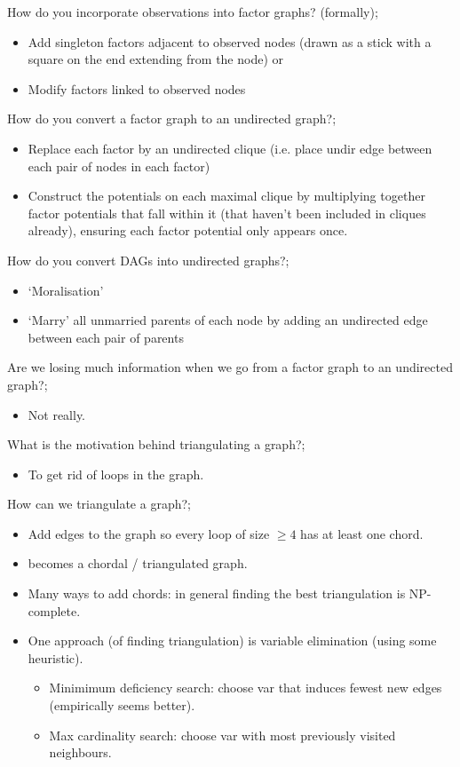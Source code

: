 \documentclass{article}
\begin{document}
How do you incorporate observations into factor graphs? (formally); \begin{itemize}
    \item Add singleton factors adjacent to observed nodes (drawn as a stick with a square on the end extending from the node) or
    \item Modify factors linked to observed nodes
\end{itemize}

How do you convert a factor graph to an undirected graph?; \begin{itemize}
    \item Replace each factor by an undirected clique (i.e. place undir edge between each pair of nodes in each factor)
    \item Construct the potentials on each maximal clique by multiplying together factor potentials that fall within it (that haven't been included in cliques already), ensuring each factor potential only appears once.
\end{itemize}

How do you convert DAGs into undirected graphs?; \begin{itemize}
    \item `Moralisation'
    \item `Marry' all unmarried parents of each node by adding an undirected edge between each pair of parents
\end{itemize}

Are we losing much information when we go from a factor graph to an undirected graph?; \begin{itemize}
    \item Not really.
\end{itemize}

What is the motivation behind triangulating a graph?; \begin{itemize}
    \item To get rid of loops in the graph.
\end{itemize}

How can we triangulate a graph?; \begin{itemize}
    \item Add edges to the graph so every loop of size $\geq 4$ has at least one chord.
    \item becomes a chordal / triangulated graph.
    \item Many ways to add chords: in general finding the best triangulation is NP-complete. 
    \item One approach (of finding triangulation) is variable elimination (using some heuristic).
    \begin{itemize}
        \item Minimimum deficiency search: choose var that induces fewest new edges (empirically seems better).
        \item Max cardinality search: choose var with most previously visited neighbours.
    \end{itemize}
\end{itemize}
\end{document}
